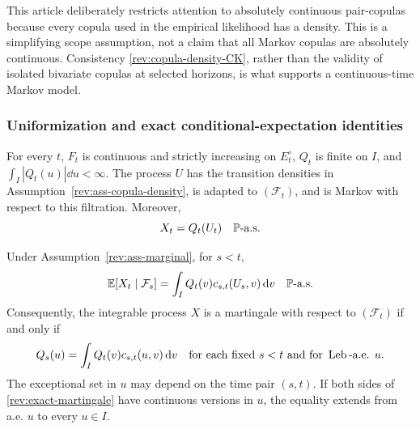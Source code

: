 \begin{remark}
This article deliberately restricts attention to absolutely continuous
pair-copulas because every copula used in the empirical likelihood has a
density.  This is a simplifying scope assumption, not a claim that all Markov
copulas are absolutely continuous.  Consistency
\eqref{rev:copula-density-CK}, rather than the validity of isolated bivariate
copulas at selected horizons, is what supports a continuous-time Markov model.
\end{remark}

\subsubsection{Uniformization and exact conditional-expectation identities}

\begin{assumption}
\label{rev:ass-marginal}
For every $t$, $F_t$ is continuous and strictly increasing on $E_t^\circ$,
$Q_t$ is finite on $I$, and $\int_I|Q_t(u)|\dd u<\infty$.  The process $U$ has
the transition densities in Assumption~\ref{rev:ass-copula-density}, is
adapted to $(\mathcal F_t)$, and is Markov with respect to this filtration.
Moreover,
\begin{equation}
X_t=Q_t(U_t)\quad\mathbb P\text{-a.s.}
\label{rev:uniformization}
\end{equation}
\end{assumption}

\begin{theorem}
\label{rev:thm-exact-density}
Under Assumption~\ref{rev:ass-marginal}, for $s<t$,
\begin{equation}
\mathbb E[X_t\mid\mathcal F_s]
=\int_IQ_t(v)c_{s,t}(U_s,v)\,\mathrm d v
\quad\mathbb P\text{-a.s.}
\label{rev:conditional-quantile}
\end{equation}
Consequently, the integrable process $X$ is a martingale with respect to
$(\mathcal F_t)$ if and only if
\begin{equation}
Q_s(u)=\int_IQ_t(v)c_{s,t}(u,v)\,\mathrm d v
\quad\text{for each fixed }s<t\text{ and for }\operatorname{Leb}\text{-a.e. }u.
\label{rev:exact-martingale}
\end{equation}
The exceptional set in $u$ may depend on the time pair $(s,t)$.  If both sides
of \eqref{rev:exact-martingale} have continuous versions in $u$, the equality
extends from a.e. $u$ to every $u\in I$.
\end{theorem}

